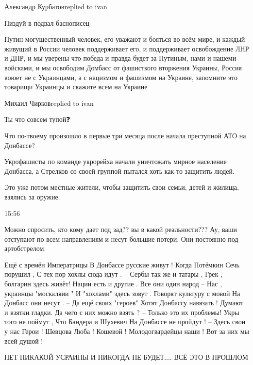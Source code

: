 Александр Курбатовreplied to ivan

Пиздуй в подвал баснописец


Путин могущественный человек, его уважают и бояться во всём мире, и каждый
живущий в России человек поддерживает его, и поддерживает освобождение ЛНР и
ДНР, и мы уверены что победа и правда будет за Путиным, нами и нашеми войсками,
и мы освободим Домбасс от фашисткого вторжения Украины, Россия воюет не с
Украинцами, а с нацизмом и фашизмом на Украине, запомните это товарищи Украинцы
и скажите всем на Украине

Михаил Чирковreplied to ivan

Ты что совсем тупой❓

Что по-твоему произошло в первые три месяца после начала преступной АТО на Донбассе? 

Укрофашисты по команде укрорейха начали уничтожать мирное население Донбасса, а
Стрелков со своей группой пытался хоть как-то защитить людей. 

Это уже потом местные жители, чтобы защитить свои семьи, детей и жилища,
взялись за оружие.

15:56

Можно спросить, кто кому дает под зад?? вы в какой реальности??? Ау, ваши
отступают по всем направлениям и несут большие потери. Они постоянно под
артобстрелом.

Ещё с времён Императрицы
В Донбассе русские живут !
Когда Потёмкин Сечь порушил ,
С тех пор хохлы сюда идут .
--
Сербы так-же и татары ,
Грек , болгарин здесь живёт!
Нации есть и другие .
Все они один народ
--
Нас , украинцы "москаляии "
И "хохлами" здесь зовут .
Говорят культуру с мовой
На Донбасс они несут .
--
Да ещё своих "героев"
Хотят Донбассу навязать !
Думают и взятки гладки.
Да чего с них можно взять ?
--
Только это их проблемы!
Укры того не поймут ,
Что Бандера и Шухевич
На Донбассе не пройдут !
--
Здесь свои у нас Герои !
Шевцова Люба ! Кошевой !
Молодогвардейцы наши !
Вот за них мы всей душой !

НЕТ НИКАКОЙ УСРАИНЫ И НИКОГДА НЕ БУДЕТ.... ВСЁ ЭТО В ПРОШЛОМ🤣🤣🤣🤣

